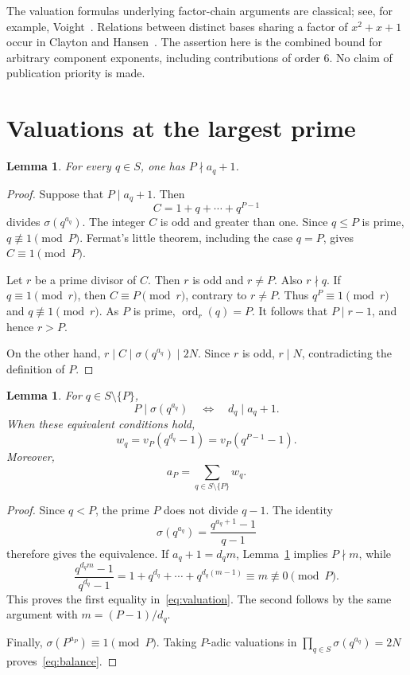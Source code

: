\documentclass[11pt]{article}
\newtheorem{lemma}[theorem]{Lemma}
\theoremstyle{remark}
\DeclareMathOperator{\ord}{ord}
\begin{document}
The valuation formulas underlying factor-chain arguments are classical; see, for example, Voight~\cite{Voight}. Relations between distinct bases sharing a factor of $x^2+x+1$ occur in Clayton and Hansen~\cite{ClaytonHansen}. The assertion here is the combined bound for arbitrary component exponents, including contributions of order $6$. No claim of publication priority is made.

\section{Valuations at the largest prime}

\begin{lemma}\label{lem:noexponent}
For every $q\in S$, one has $P\nmid a_q+1$.
\end{lemma}
\begin{proof}
Suppose that $P\mid a_q+1$. Then
\[
 C=1+q+\cdots+q^{P-1}
\]
divides $\sigma(q^{a_q})$. The integer $C$ is odd and greater than one. Since $q\le P$ is prime, $q\not\equiv1\pmod P$. Fermat's little theorem, including the case $q=P$, gives $C\equiv1\pmod P$.

Let $r$ be a prime divisor of $C$. Then $r$ is odd and $r\ne P$. Also $r\nmid q$. If $q\equiv1\pmod r$, then $C\equiv P\pmod r$, contrary to $r\ne P$. Thus $q^P\equiv1\pmod r$ and $q\not\equiv1\pmod r$. As $P$ is prime, $\ord_r(q)=P$. It follows that $P\mid r-1$, and hence $r>P$.

On the other hand, $r\mid C\mid\sigma(q^{a_q})\mid2N$. Since $r$ is odd, $r\mid N$, contradicting the definition of $P$.
\end{proof}

\begin{lemma}\label{lem:valuation}
For $q\in S\setminus\{P\}$,
\[
 P\mid\sigma(q^{a_q})\quad\Longleftrightarrow\quad d_q\mid a_q+1.
\]
When these equivalent conditions hold,
\begin{equation}\label{eq:valuation}
 w_q=v_P(q^{d_q}-1)=v_P(q^{P-1}-1).
\end{equation}
Moreover,
\begin{equation}\label{eq:balance}
 a_P=\sum_{q\in S\setminus\{P\}}w_q.
\end{equation}
\end{lemma}
\begin{proof}
Since $q<P$, the prime $P$ does not divide $q-1$. The identity
\[
 \sigma(q^{a_q})=\frac{q^{a_q+1}-1}{q-1}
\]
therefore gives the equivalence. If $a_q+1=d_qm$, Lemma~\ref{lem:noexponent} implies $P\nmid m$, while
\[
 \frac{q^{d_qm}-1}{q^{d_q}-1}
 =1+q^{d_q}+\cdots+q^{d_q(m-1)}\equiv m\not\equiv0\pmod P.
\]
This proves the first equality in~\eqref{eq:valuation}. The second follows by the same argument with $m=(P-1)/d_q$.

Finally, $\sigma(P^{a_P})\equiv1\pmod P$. Taking $P$-adic valuations in $\prod_{q\in S}\sigma(q^{a_q})=2N$ proves~\eqref{eq:balance}.
\end{proof}
\end{document}
